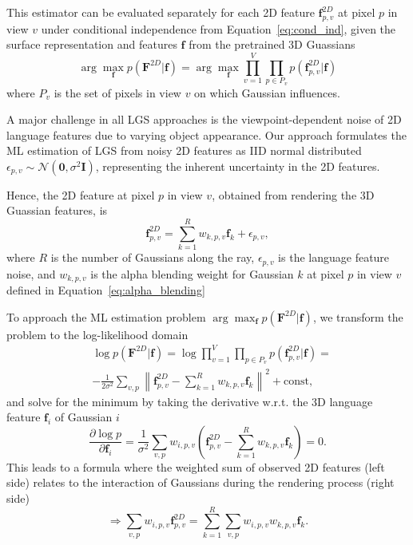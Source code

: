 This estimator can be evaluated separately for each 2D feature $\mathbf{f}_{p,v}^{2D}$ at pixel $p$ in view $v$ under conditional independence from Equation~\ref{eq:cond_ind}, given the surface representation and features $\mathbf{f}$ from the pretrained 3D Guassians
\begin{equation}
     \arg\max_\mathbf{f} p(\mathbf{F}^{2D}|\mathbf{f}) =  \arg\max_\mathbf{f} \prod_{v=1}^V \prod_{p \in P_v} p(\mathbf{f}_{p,v}^{2D}|\mathbf{f})
\end{equation}
where $P_v$ is the set of pixels in view $v$ on which Gaussian influences.

A major challenge in all LGS approaches is the viewpoint-dependent noise of 2D language features due to varying object appearance. Our approach formulates the ML estimation of LGS from noisy 2D features as IID normal distributed $\epsilon_{p,v} \sim \mathcal{N}(\mathbf{0}, \sigma^2\mathbf{I})$, representing the inherent uncertainty in the 2D features.

Hence, the 2D feature at pixel $p$ in view $v$, obtained from rendering the 3D Guassian features, is
\begin{equation}
    \mathbf{f}_{p,v}^{2D} = \sum_{k=1}^R w_{k,p,v}\mathbf{f}_k + \epsilon_{p,v},
\end{equation}
where $R$ is the number of Gaussians along the ray, $\epsilon_{p,v}$ is the language feature noise, and $w_{k,p,v}$ is the alpha blending weight for Gaussian $k$ at pixel $p$ in view $v$ defined in Equation~\ref{eq:alpha_blending}

To approach the ML estimation problem $\arg\max_\mathbf{f} p(\mathbf{F}^{2D}|\mathbf{f})$, we transform the problem to the log-likelihood domain
\begin{equation}
    \begin{aligned}
        &\log p(\mathbf{F}^{2D}|\mathbf{f}) = \log \prod_{v=1}^V \prod_{p \in P_v} p(\mathbf{f}_{p,v}^{2D}|\mathbf{f}) =\\
        &-\frac{1}{2\sigma^2} \sum_{v,p} \left\| \mathbf{f}_{p,v}^{2D} - \sum_{k=1}^R w_{k,p,v}\mathbf{f}_k \right\|^2 + \text{const},
    \end{aligned}
\end{equation}
and solve for the minimum by taking the derivative w.r.t. the 3D language feature $\mathbf{f}_i$ of Gaussian $i$
\begin{equation}
    \frac{\partial \log p}{\partial \mathbf{f}_i} = \frac{1}{\sigma^2} \sum_{v,p} w_{i,p,v} \left( \mathbf{f}_{p,v}^{2D} - \sum_{k=1}^R w_{k,p,v}\mathbf{f}_k \right) = 0.
\end{equation}
This leads to a formula where the weighted sum of observed 2D features (left side) relates to the interaction of Gaussians during the rendering process (right side)
\begin{equation}
    \Rightarrow \sum_{v,p} w_{i,p,v}\mathbf{f}_{p,v}^{2D} = \sum_{k=1}^R \sum_{v,p} w_{i,p,v}w_{k,p,v} \mathbf{f}_k.
\end{equation}


